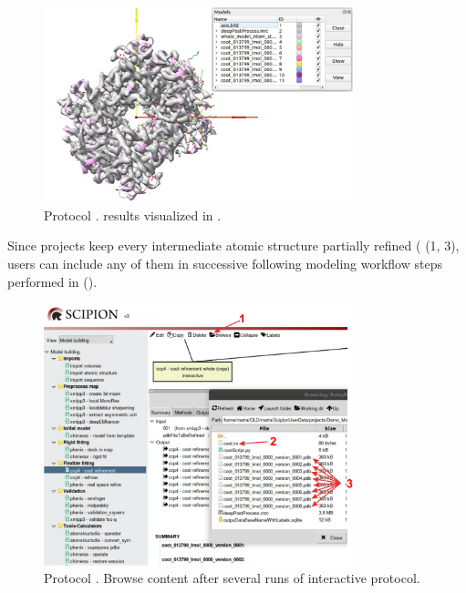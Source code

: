 \begin{itemize}
  \begin{figure}[H]
    \centering 
    \captionsetup{width=.9\linewidth} 
    \includegraphics[width=0.80\textwidth]{Images_appendix/Fig123.pdf}
    \caption{Protocol . \coot results visualized in \chimera.}
    \label{fig:app_protocol_coot_5}
   \end{figure}
   
  Since \scipion projects keep every intermediate atomic structure partially refined ( (1, 3), users can include any of them in successive following modeling workflow steps performed in \scipion ().
  
  \begin{figure}[H]
    \centering 
    \captionsetup{width=.9\linewidth}  
    \includegraphics[width=0.80\textwidth]{Images_appendix/Fig124.pdf}
    \caption{Protocol . Browse content after several runs of interactive \coot protocol.}
    \label{fig:app_protocol_coot_6}
   \end{figure}
   

\end{itemize}
